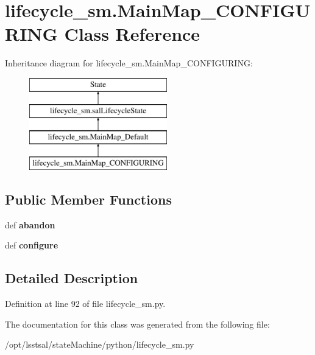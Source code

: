 \hypertarget{classlifecycle__sm_1_1_main_map___c_o_n_f_i_g_u_r_i_n_g}{\section{lifecycle\-\_\-sm.\-Main\-Map\-\_\-\-C\-O\-N\-F\-I\-G\-U\-R\-I\-N\-G Class Reference}
\label{classlifecycle__sm_1_1_main_map___c_o_n_f_i_g_u_r_i_n_g}
}
Inheritance diagram for lifecycle\-\_\-sm.\-Main\-Map\-\_\-\-C\-O\-N\-F\-I\-G\-U\-R\-I\-N\-G\-:\begin{figure}[H]
\begin{center}
\leavevmode
\includegraphics[height=4.000000cm]{classlifecycle__sm_1_1_main_map___c_o_n_f_i_g_u_r_i_n_g}
\end{center}
\end{figure}
\subsection*{Public Member Functions}
\begin{DoxyCompactItemize}
\item 
\hypertarget{classlifecycle__sm_1_1_main_map___c_o_n_f_i_g_u_r_i_n_g_a7ea8cde6258c40f469e683808b5af323}{def {\bfseries abandon}}\label{classlifecycle__sm_1_1_main_map___c_o_n_f_i_g_u_r_i_n_g_a7ea8cde6258c40f469e683808b5af323}

\item 
\hypertarget{classlifecycle__sm_1_1_main_map___c_o_n_f_i_g_u_r_i_n_g_a8f550bc7daacda50542007b55b3a1aab}{def {\bfseries configure}}\label{classlifecycle__sm_1_1_main_map___c_o_n_f_i_g_u_r_i_n_g_a8f550bc7daacda50542007b55b3a1aab}

\end{DoxyCompactItemize}


\subsection{Detailed Description}


Definition at line 92 of file lifecycle\-\_\-sm.\-py.



The documentation for this class was generated from the following file\-:\begin{DoxyCompactItemize}
\item 
/opt/lsstsal/state\-Machine/python/lifecycle\-\_\-sm.\-py\end{DoxyCompactItemize}
